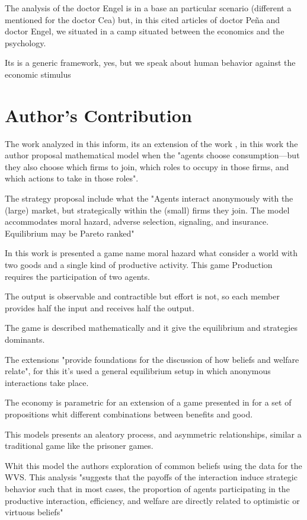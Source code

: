 \documentclass{article}
\begin{document}
The analysis of the doctor Engel is in a base an particular scenario (different a mentioned for the doctor Cea) but, in this cited articles of doctor Peña and doctor Engel, we situated in a camp situated between the economics and the psychology.

Its is a generic framework, yes, but we speak about human behavior  against the economic stimulus

\section{Author's Contribution}

The work analyzed in this inform, its an extension of the work \cite{art5:articulo}, in this work the author proposal mathematical model when the "agents choose consumption—but they also choose which firms to join, which roles to occupy in those firms, and which actions to take in those roles". 

The strategy proposal include what the  "Agents interact anonymously with the (large) market, but strategically within the (small) firms they join. The model accommodates moral hazard, adverse selection, signaling, and insurance. Equilibrium may be Pareto ranked"

In this work is presented a game name moral hazard what consider a world with two goods and a single  kind of productive activity. This game Production requires the participation of two agents.

The output is observable and contractible but effort is not, so each member provides half the input and receives half the output.

The game is described mathematically and it give the equilibrium and strategies dominants.

The extensions "provide foundations for the discussion of how beliefs and welfare relate", for this it's used a general equilibrium setup in which anonymous interactions take place. 

The economy is parametric for an extension of a game presented in \cite{art5:articulo} for a set of propositions whit different combinations between benefits and good.

This models presents an aleatory process, and asymmetric relationships, similar a traditional game like the prisoner games.

Whit this model the authors exploration of common beliefs using the data for the WVS. This analysis "suggests that the payoffs of the interaction induce strategic behavior such that in most cases, the proportion of agents participating in the productive interaction, efficiency, and welfare are directly related to optimistic or virtuous beliefs"
\end{document}
